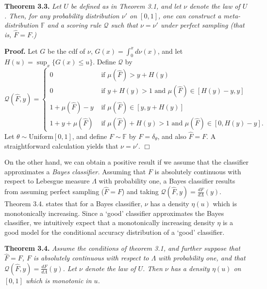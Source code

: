 \documentclass{article}
\begin{document}
\noindent\textbf{Theorem 3.3.} \emph{ Let $U$ be defined as in Theorem
  3.1, and let $\nu$ denote the law of $U$.  Then, for any probability
  distribution $\nu'$ on $[0,1]$, one can construct a
  meta-distribution $\mathbb{F}$ and a scoring rule $\mathcal{Q}$ such
  that $\nu = \nu'$ under perfect sampling (that is, $\hat{F} = F$.)  }

\textbf{Proof.}  
Let $G$ be the cdf of $\nu$, $G(x) = \int_0^x d\nu(x)$, and let $H(u) = \sup_x \{G(x) \leq u\}$.
Define $\mathcal{Q}$ by
\[
\mathcal{Q}(\hat{F}, y) = \begin{cases}
0 &\text{ if }\mu(\hat{F}) > y + H(y)\\
0 & \text{ if }y + H(y) > 1 \text{ and }\mu(\hat{F}) \in [H(y) - y, y]\\
1 + \mu(\hat{F}) - y &\text{ if } \mu(\hat{F}) \in [y, y + H(y)]\\
1 + y + \mu(\hat{F}) &\text{ if }\mu(\hat{F}) + H(y) > 1 \text{ and }\mu(\hat{F}) \in [0, H(y) - y]. 
\end{cases}
\]
Let $\theta \sim \text{Uniform}[0,1]$,
and define $F \sim \mathbb{F}$ by $F = \delta_\theta$, and also $\hat{F} = F.$
A straightforward calculation yields that $\nu = \nu'$. $\Box$

On the other hand, we can obtain a positive result if we assume that
the classifier approximates a \emph{Bayes classifier.}
Assuming that $F$ is absolutely continuous with respect to Lebesgue measure $\Lambda$ with probability one,
a Bayes classifier results from assuming perfect sampling ($\hat{F} = F$) and taking
$\mathcal{Q}(\hat{F}, y) = \frac{dF}{d\Lambda}(y)$.
Theorem 3.4. states that for a Bayes classifier, $\nu$ has a density $\eta(u)$ which is monotonically increasing.
Since a `good' classifier approximates the Bayes classifier, we intuitively expect that a monotonically
increasing density $\eta$ is a good model for the conditional accuracy distribution of a `good' classifier.

\noindent\textbf{Theorem 3.4.} \emph{ Assume the conditions of theorem 3.1, and further suppose
that $\hat{F} = F$, $F$ is absolutely continuous with respect to $\Lambda$ with probability one,
and that $\mathcal{Q}(\hat{F}, y) = \frac{dF}{d\Lambda}(y)$.
Let $\nu$ denote the law of $U$.    Then $\nu$ has a density $\eta(u)$ on $[0, 1]$ which is monotonic in $u$.
}
\end{document}
